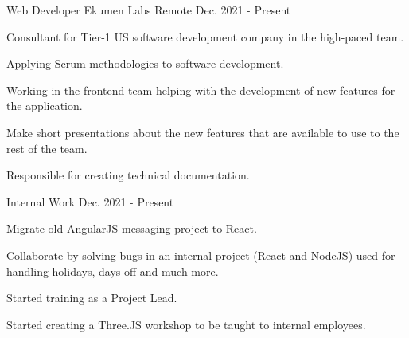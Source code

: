 

\begin{cventries}

  \cventry
    {Web Developer} %
    {Ekumen Labs} %
    {Remote} %
    {Dec. 2021 - Present} %
    {
      \begin{cvitems} %
        \item {Consultant for Tier-1 US software development company in the high-paced team.}
        \item {Applying Scrum methodologies to software development.}
        \item {Working in the frontend team helping with the development of new features for the application.}
        \item {Make short presentations about the new features that are available to use to the rest of the team.}
        \item {Responsible for creating technical documentation.}
      \end{cvitems}
    }
    
\cventry
{Internal Work} %
{} %
{}  %
{Dec. 2021 - Present} %
{
  \begin{cvitems} %
      \item{Migrate old AngularJS messaging project to React.}
    \item{Collaborate by solving bugs in an internal project (React and NodeJS) used for handling holidays, days off and much more.}
    \item{Started training as a Project Lead.}
    \item{Started creating a Three.JS workshop to be taught to internal employees.}
  \end{cvitems}
}


\end{cventries}
